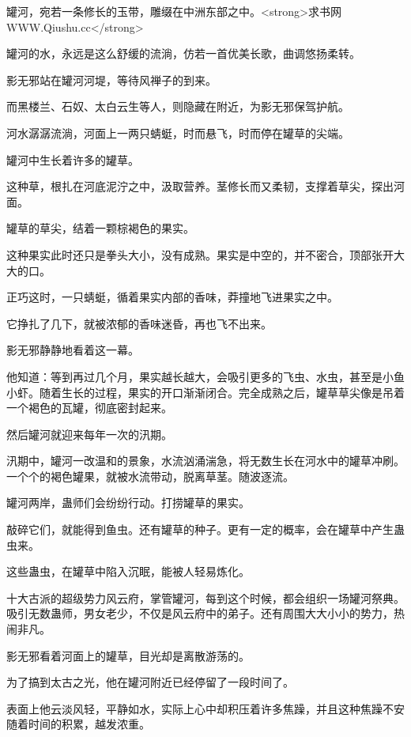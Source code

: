 
\begin{this_body}

罐河，宛若一条修长的玉带，雕缀在中洲东部之中。<strong>求书网WWW.Qiushu.cc</strong>

罐河的水，永远是这么舒缓的流淌，仿若一首优美长歌，曲调悠扬柔转。

影无邪站在罐河河堤，等待风禅子的到来。

而黑楼兰、石奴、太白云生等人，则隐藏在附近，为影无邪保驾护航。

河水潺潺流淌，河面上一两只蜻蜓，时而悬飞，时而停在罐草的尖端。

罐河中生长着许多的罐草。

这种草，根扎在河底泥泞之中，汲取营养。茎修长而又柔韧，支撑着草尖，探出河面。

罐草的草尖，结着一颗棕褐色的果实。

这种果实此时还只是拳头大小，没有成熟。果实是中空的，并不密合，顶部张开大大的口。

正巧这时，一只蜻蜓，循着果实内部的香味，莽撞地飞进果实之中。

它挣扎了几下，就被浓郁的香味迷昏，再也飞不出来。

影无邪静静地看着这一幕。

他知道：等到再过几个月，果实越长越大，会吸引更多的飞虫、水虫，甚至是小鱼小虾。随着生长的过程，果实的开口渐渐闭合。完全成熟之后，罐草草尖像是吊着一个褐色的瓦罐，彻底密封起来。

然后罐河就迎来每年一次的汛期。

汛期中，罐河一改温和的景象，水流汹涌湍急，将无数生长在河水中的罐草冲刷。一个个的褐色罐果，就被水流带动，脱离草茎。随波逐流。

罐河两岸，蛊师们会纷纷行动。打捞罐草的果实。

敲碎它们，就能得到鱼虫。还有罐草的种子。更有一定的概率，会在罐草中产生蛊虫来。

这些蛊虫，在罐草中陷入沉眠，能被人轻易炼化。

十大古派的超级势力风云府，掌管罐河，每到这个时候，都会组织一场罐河祭典。吸引无数蛊师，男女老少，不仅是风云府中的弟子。还有周围大大小小的势力，热闹非凡。

影无邪看着河面上的罐草，目光却是离散游荡的。

为了搞到太古之光，他在罐河附近已经停留了一段时间了。

表面上他云淡风轻，平静如水，实际上心中却积压着许多焦躁，并且这种焦躁不安随着时间的积累，越发浓重。


\end{this_body}
